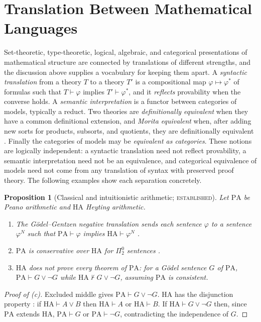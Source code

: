 \documentclass[11pt]{article}
\newtheorem{proposition}[theorem]{Proposition}
\theoremstyle{definition}
\theoremstyle{remark}
\newcommand{\stE}{\textsc{established}}
\begin{document}
\section{Translation Between Mathematical Languages}

Set-theoretic, type-theoretic, logical, algebraic, and categorical presentations of mathematical structure are connected by translations of different strengths, and the discussion above supplies a vocabulary for keeping them apart. A \emph{syntactic translation} from a theory $T$ to a theory $T'$ is a compositional map $\varphi\mapsto\varphi^{\ast}$ of formulas such that $T\vdash\varphi$ implies $T'\vdash\varphi^{\ast}$, and it \emph{reflects} provability when the converse holds. A \emph{semantic interpretation} is a functor between categories of models, typically a reduct. Two theories are \emph{definitionally equivalent} when they have a common definitional extension, and \emph{Morita equivalent} when, after adding new sorts for products, subsorts, and quotients, they are definitionally equivalent \cite{barretthalvorson}. Finally the categories of models may be \emph{equivalent as categories}. These notions are logically independent: a syntactic translation need not reflect provability, a semantic interpretation need not be an equivalence, and categorical equivalence of models need not come from any translation of syntax with preserved proof theory. The following examples show each separation concretely.

\begin{proposition}[Classical and intuitionistic arithmetic; \stE]\label{prop:PAHA}
Let $\mathrm{PA}$ be Peano arithmetic and $\mathrm{HA}$ Heyting arithmetic.
\begin{enumerate}[label=(\alph*)]
\item The G\"odel--Gentzen negative translation sends each sentence $\varphi$ to a sentence $\varphi^N$ such that $\mathrm{PA}\vdash\varphi$ implies $\mathrm{HA}\vdash\varphi^N$ \cite{troelstravandalen}.
\item $\mathrm{PA}$ is conservative over $\mathrm{HA}$ for $\Pi^0_2$ sentences \cite{friedman}.
\item $\mathrm{HA}$ does not prove every theorem of $\mathrm{PA}$: for a G\"odel sentence $G$ of $\mathrm{PA}$, $\mathrm{PA}\vdash G\vee\neg G$ while $\mathrm{HA}\nvdash G\vee\neg G$, assuming $\mathrm{PA}$ is consistent.
\end{enumerate}
\end{proposition}
\begin{proof}[Proof of (c)]
Excluded middle gives $\mathrm{PA}\vdash G\vee\neg G$. $\mathrm{HA}$ has the disjunction property \cite{troelstravandalen}: if $\mathrm{HA}\vdash A\vee B$ then $\mathrm{HA}\vdash A$ or $\mathrm{HA}\vdash B$. If $\mathrm{HA}\vdash G\vee\neg G$ then, since $\mathrm{PA}$ extends $\mathrm{HA}$, $\mathrm{PA}\vdash G$ or $\mathrm{PA}\vdash\neg G$, contradicting the independence of $G$.
\end{proof}
\end{document}
